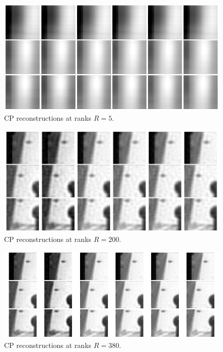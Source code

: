 \documentclass[pdflatex,sn-mathphys-ay]{sn-jnl}
\begin{document}
\begin{figure}
  \centering
  \includegraphics[width=\linewidth]{CP rank 5.png}
  \caption{CP reconstructions at ranks $R = 5$.}
  \label{fig:cp-rank-visuals5}
\end{figure}

\begin{figure}
  \centering
  \includegraphics[width=\linewidth]{CP rank 200.png}
  \caption{CP reconstructions at ranks $R = 200$.}
  \label{fig:cp-rank-visuals200}
\end{figure}

\begin{figure}
  \centering
  \includegraphics[width=\linewidth]{CP rank 380.png}
  \caption{CP reconstructions at ranks $R = 380$.}
  \label{fig:cp-rank-visuals380}
\end{figure}
\end{document}
